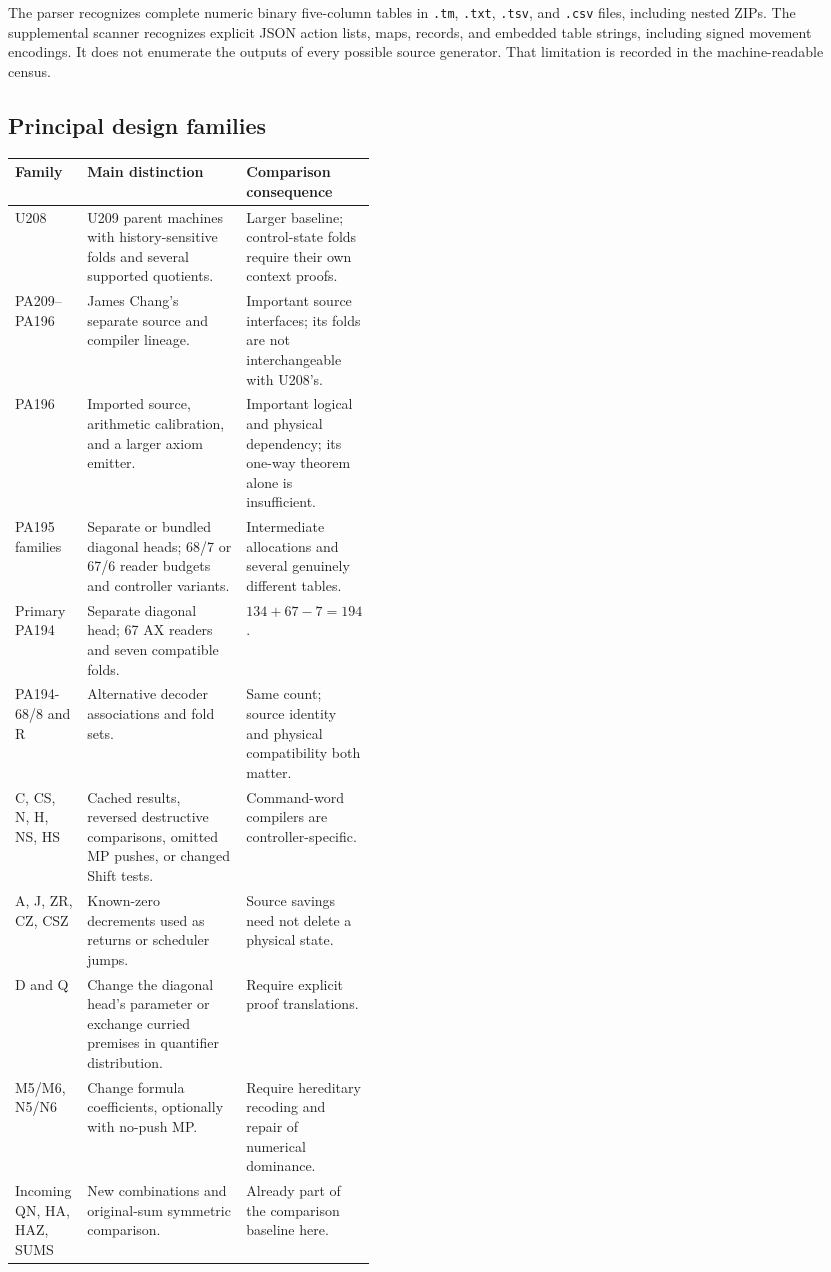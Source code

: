 \documentclass[11pt,letterpaper]{article}
\begin{document}
The parser recognizes complete numeric binary five-column tables in
\texttt{.tm}, \texttt{.txt}, \texttt{.tsv}, and \texttt{.csv} files, including
nested ZIPs. The supplemental scanner recognizes explicit JSON action
lists, maps, records, and embedded table strings, including signed movement
encodings. It does not enumerate the outputs of every possible source
generator. That limitation is recorded in the machine-readable census.

\subsection{Principal design families}

\begin{center}\small
\begin{tabularx}{\linewidth}{@{}p{0.20\linewidth}Xp{0.22\linewidth}@{}}\toprule
Family & Main distinction & Comparison consequence\\\midrule
U208 & U209 parent machines with history-sensitive folds and several supported quotients. & Larger baseline; control-state folds require their own context proofs.\\
PA209--PA196 & James Chang's separate source and compiler lineage. & Important source interfaces; its folds are not interchangeable with U208's.\\
PA196 & Imported source, arithmetic calibration, and a larger axiom emitter. & Important logical and physical dependency; its one-way theorem alone is insufficient.\\
PA195 families & Separate or bundled diagonal heads; 68/7 or 67/6 reader budgets and controller variants. & Intermediate allocations and several genuinely different tables.\\
Primary PA194 & Separate diagonal head; 67 AX readers and seven compatible folds. & $134+67-7=194$.\\
PA194-68/8 and R & Alternative decoder associations and fold sets. & Same count; source identity and physical compatibility both matter.\\
C, CS, N, H, NS, HS & Cached results, reversed destructive comparisons, omitted MP pushes, or changed Shift tests. & Command-word compilers are controller-specific.\\
A, J, ZR, CZ, CSZ & Known-zero decrements used as returns or scheduler jumps. & Source savings need not delete a physical state.\\
D and Q & Change the diagonal head's parameter or exchange curried premises in quantifier distribution. & Require explicit proof translations.\\
M5/M6, N5/N6 & Change formula coefficients, optionally with no-push MP. & Require hereditary recoding and repair of numerical dominance.\\
Incoming QN, HA, HAZ, SUMS & New combinations and original-sum symmetric comparison. & Already part of the comparison baseline here.\\\bottomrule
\end{tabularx}
\end{center}
\end{document}
